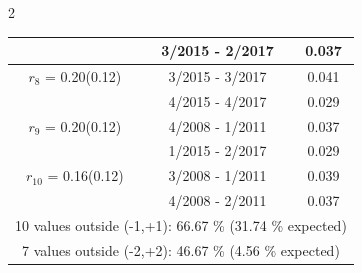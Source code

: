 \begin{multicols}{2}
{\begin{tabular}{ccc}
&        3/2015 -  2/2017 &        0.037  \vspace{-.02in} \\ \hline 
  $r_{ 8}$ = 0.20(0.12) &       3/2015 -  3/2017 &        0.041   \vspace{-.10in} \\  
&        4/2015 -  4/2017 &        0.029  \vspace{-.02in} \\ \hline 
  $r_{ 9}$ = 0.20(0.12) &       4/2008 -  1/2011 &        0.037   \vspace{-.10in} \\  
&        1/2015 -  2/2017 &        0.029  \vspace{-.02in} \\ \hline 
  $r_{10}$ = 0.16(0.12) &       3/2008 -  1/2011 &        0.039   \vspace{-.10in} \\  
&        4/2008 -  2/2011 &        0.037  \vspace{-.02in} \\ \hline 
\multicolumn{3}{c}{              10 values outside (-1,+1): 66.67  \% (31.74  \% expected)}\vspace{-.10in} \\ 
\multicolumn{3}{c}{               7 values outside (-2,+2): 46.67 \%  (4.56 \% expected) } \\
 \end{tabular} \\ 
 } 
\end{multicols} 
